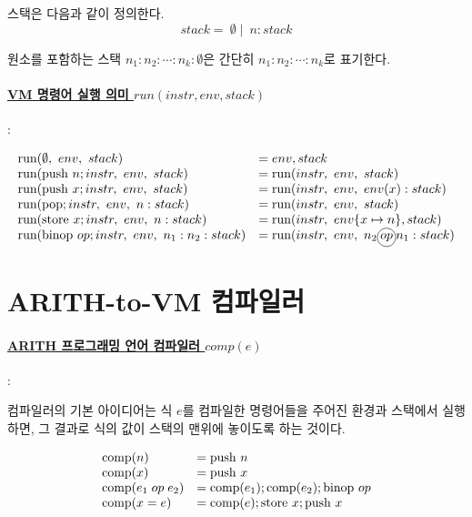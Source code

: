 \documentclass[runningheads]{llncs}
\newcommand{\circledop}[1]{%
    \tikz[baseline=(X.base)] \node[draw, shape=circle, inner sep=1pt] (X) {\ensuremath{#1}};%
}
\begin{document}
스택은 다음과 같이 정의한다.
\[
stack = \ \emptyset \mid \ n : stack
\]

원소를 포함하는 스택  $n_1 : n_2 : \cdots : n_k : \emptyset $은 간단히  $n_1 : n_2 : \cdots : n_k $로 표기한다.

\paragraph{\underline{VM 명령어 실행 의미 $run(instr, env, stack)$}}:

\[
\begin{array}{l l}
    \text{run}(\emptyset, \ env, \ stack) &= env, stack \\
    \text{run}(\text{push } n; instr, \ env, \ stack) &= \text{run}(instr, \ env, \ stack) \\
    \text{run}(\text{push } x; instr, \ env, \ stack) &= \text{run}(instr, \ env, \ env(x) : stack) \\
    \text{run}(\text{pop}; instr, \ env, \ n : stack) &= \text{run}(instr, \ env, \ stack) \\
    \text{run}(\text{store } x; instr, \ env, \ n : stack) &= \text{run}(instr, \ env \{ x \mapsto n \}, stack) \\
    \text{run}(\text{binop } op; instr, \ env, \ n_1 : n_2 : stack) &= \text{run}(instr, \ env, \ n_2 \circledop{op} n_1 : stack)
\end{array}
\]

\section{ARITH-to-VM 컴파일러}

\paragraph{\underline{ARITH 프로그래밍 언어 컴파일러 $comp{(e)}$}}:

컴파일러의 기본 아이디어는 식 $e$를 컴파일한 명령어들을 주어진 환경과 스택에서 실행하면, 그 결과로 식의 값이 스택의 맨위에 놓이도록 하는 것이다.

\[
\begin{array}{l l}
    \text{comp}(n) &= \text{push } n \\
    \text{comp}(x) &= \text{push } x \\
    \text{comp}(e_1 \; op \; e_2) &= \text{comp}(e_1); \text{comp}(e_2); \text{binop } op \\
    \text{comp}(x = e) &= \text{comp}(e); \text{store } x; \text{push } x
\end{array}
\]
\end{document}
